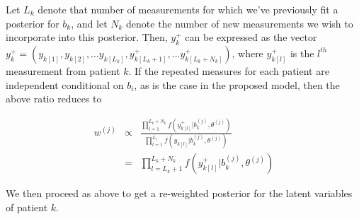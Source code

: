 \documentclass[12pt, letterpaper]{article}
\begin{document}
Let $L_{k}$ denote that number of measurements for which we've previously fit a posterior for $b_{k}$, and let $N_{k}$ denote the number of new measurements we wish to incorporate into this posterior. Then, $y_{k}^{+}$ can be expressed as the vector $y_{k}^{+}=(y_{k[1]},y_{k[2]},\dots y_{k[L_{k}]},y_{k[L_{k}+1]}^{+},\dots y_{k[L_{k}+N_{k}]}^{+})$, where $y_{k[l]}^{+}$ is the $l^{th}$ measurement from patient $k$. If the repeated measures for each patient are independent conditional on $b_{i}$, as is the case in the proposed model, then the above ratio reduces to

\begin{eqnarray*}
w^{(j)} & \propto & \frac{\prod_{l=1}^{L_{k}+N_{k}}f(\ensuremath{ y_{k[l]}^{+}} |b_{k}^{(j)},\theta^{(j)})}{\prod_{l=1}^{L_{i}}f(\ensuremath{y_{k[l]}} |b_{ k}^{(j)},\theta^{(j)})}\\
 & = & \prod_{l=L_{k}+1}^{L_{k}+N_{k}}f(\ensuremath{y_{k[l]}^{+}}|b_{k}^{(j)},\theta^{(j)})
\end{eqnarray*}


We then proceed as above to get a re-weighted posterior for the latent variables of patient $k$. 
\end{document}
